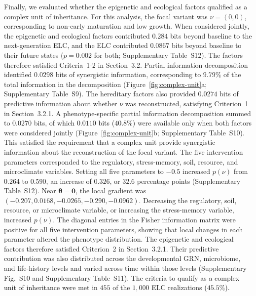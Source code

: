 \documentclass[pdflatex,sn-mathphys-num]{sn-jnl}
\theoremstyle{thmstylethree}
\theoremstyle{thmstyleone}
\begin{document}
Finally, we evaluated whether the epigenetic and ecological factors qualified as a complex unit of inheritance. For this analysis, the focal variant was $\nu=(0,0)$, corresponding to non-early maturation and low growth. When considered jointly, the epigenetic and ecological factors contributed $0.284$ bits beyond baseline to the next-generation ELC, and the ELC contributed $0.0867$ bits beyond baseline to their future states ($p=0.002$ for both; Supplementary Table~S12). The factors therefore satisfied Criteria~1-2 in Section~3.2. Partial information decomposition identified $0.0298$ bits of synergistic information, corresponding to $9.79\%$ of the total information in the decomposition (Figure~\ref{fig:complex-unit}a; Supplementary Table~S9). The hereditary factors also provided $0.0274$ bits of predictive information about whether $\nu$ was reconstructed, satisfying Criterion~1 in Section~3.2.1. A phenotype-specific partial information decomposition summed to $0.0270$ bits, of which $0.0110$ bits ($40.8\%$) were available only when both factors were considered jointly (Figure~\ref{fig:complex-unit}b; Supplementary Table~S10). This satisfied the requirement that a complex unit provide synergistic information about the reconstruction of the focal variant. The five intervention parameters corresponded to the regulatory, stress-memory, soil, resource, and microclimate variables. Setting all five parameters to $-0.5$ increased $p(\nu)$ from $0.264$ to $0.590$, an increase of $0.326$, or $32.6$ percentage points (Supplementary Table~S12). Near $\boldsymbol{\theta}=\mathbf{0}$, the local gradient was $(-0.207,0.0168,-0.0265,-0.290,-0.0962)$. Decreasing the regulatory, soil, resource, or microclimate variable, or increasing the stress-memory variable, increased $p(\nu)$. The diagonal entries in the Fisher information matrix were positive for all five intervention parameters, showing that local changes in each parameter altered the phenotype distribution. The epigenetic and ecological factors therefore satisfied Criterion~2 in Section~3.2.1. Their predictive contribution was also distributed across the developmental GRN, microbiome, and life-history levels and varied across time within those levels (Supplementary Fig.~S10 and Supplementary Table~S11). The criteria to qualify as a complex unit of inheritance were met in $455$ of the $1{,}000$ ELC realizations ($45.5\%$).
\end{document}
